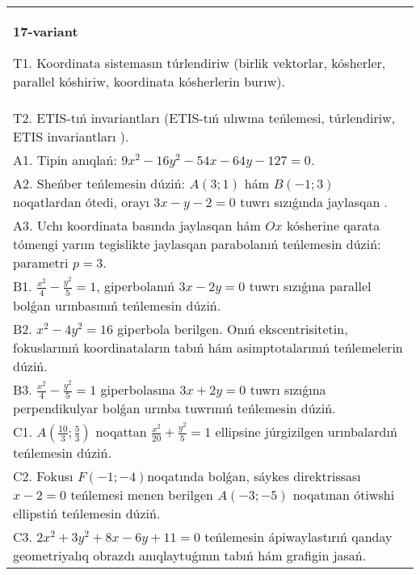 \documentclass{article}
\begin{document}
\begin{tabular}{m{17cm}}
\textbf{17-variant}
\newline

T1. Koordinata sistemasın túrlendiriw (birlik vektorlar, kósherler, parallel kóshiriw, koordinata kósherlerin burıw).\\

T2. ETIS-tıń invariantları (ETIS-tıń ulıwma teńlemesi, túrlendiriw, ETIS invariantları ).\\

A1. Tipin anıqlań: $9 x^{2}-16 y^{2}-54 x-64 y-127=0$.\\

A2. Sheńber teńlemesin dúziń: $A (3;1) $ hám $B (-1;3) $ noqatlardan ótedi, orayı $3 x-y-2=0$ tuwrı sızıǵında jaylasqan .\\

A3. Uchı koordinata basında jaylasqan hám $Ox$ kósherine qarata tómengi yarım tegislikte jaylasqan parabolanıń teńlemesin dúziń: parametri $p=3$.\\

B1. $\frac{x^{2}}{4} - \frac{y^{2}}{5} = 1$, giperbolanıń $3x - 2y = 0$ tuwrı sızıǵına parallel bolǵan urınbasınıń teńlemesin dúziń.  \\

B2. $x^{2} - 4y^{2} = 16$ giperbola berilgen. Onıń ekscentrisitetin, fokuslarınıń koordinataların tabıń hám asimptotalarınıń teńlemelerin dúziń.\\

B3. $\frac{x^{2}}{4} - \frac{y^{2}}{5} = 1$ giperbolasına $3x + 2y = 0$ tuwrı sızıǵına perpendikulyar bolǵan urınba tuwrınıń teńlemesin dúziń.\\

C1. $A(\frac{10}{3};\frac{5}{3})$ noqattan $\frac{x^{2}}{20} + \frac{y^{2}}{5} = 1$ ellipsine júrgizilgen urınbalardıń teńlemesin dúziń.  \\

C2. Fokusı $F( - 1; - 4)$noqatında bolǵan, sáykes direktrissası $x - 2 = 0$ teńlemesi menen berilgen $A( - 3; - 5)$ noqatınan ótiwshi ellipstiń teńlemesin dúziń.  \\

C3. $2x^{2} + 3y^{2} + 8x - 6y + 11 = 0$ teńlemesin ápiwaylastırıń qanday geometriyalıq obrazdı anıqlaytuǵının tabıń hám grafigin jasań.  \\

\end{tabular}
\vspace{1cm}
\end{document}
